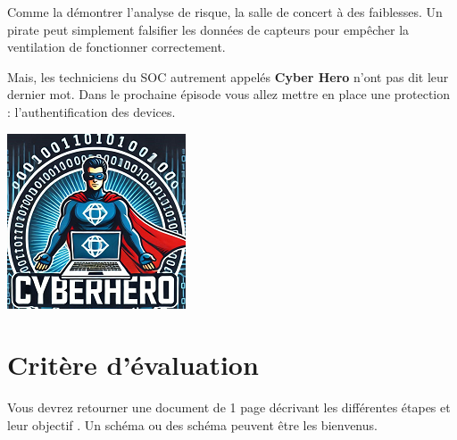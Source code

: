 \documentclass[french, 12pt]{article}%
\newif\ifPROF
\begin{document}
\begin{minipage}{0.55\linewidth}
Comme la démontrer l'analyse de risque, la salle de concert à des faiblesses. Un pirate peut simplement falsifier les données de capteurs pour empêcher la ventilation de fonctionner correctement. 


Mais, les techniciens du SOC autrement appelés \textbf{Cyber Hero} n'ont pas dit leur dernier mot. Dans le prochaine épisode vous allez mettre en place une protection : l'authentification des devices.
\end{minipage}
\begin{minipage}{0.44\linewidth}
\begin{center}
\includegraphics[scale=0.7]{./ressource/cyberHro.png}
\end{center}
\end{minipage}


\ifPROF
\color{red}
Pense bête installation.
\begin{lstlisting}[style=commande]
Admin borne wifi : 
pviland
choupette


SSID : salleCIEL
mdp : rockstar

PC_PV : 192.168.1.19
devicePV : 

lsub modele de la puce

sudo ip link set eth0 promisc on

\end{lstlisting}


Choix des puces : Ralink RT5372 

Les modèles comme le Panda PAU06 ou l’EDUP EP-MS8551
\normalcolor
\fi




\section{Critère d'évaluation}
\label{lblCritere}
Vous devrez retourner une document de 1 page décrivant les différentes étapes et leur objectif . Un schéma ou des schéma peuvent être les bienvenus.
\end{document}
